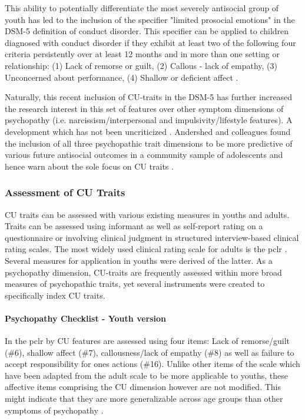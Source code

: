 This ability to potentially differentiate the most severely antisocial group of youth has led to the inclusion of the specifier "limited prosocial emotions" in the DSM-5 \parencite{DSM-5} definition of conduct disorder.
This specifier can be applied to children diagnosed with conduct disorder if they exhibit at least two of the following four criteria persistently over at least 12 months and in more than one setting or relationship:
(1) Lack of remorse or guilt,
(2) Callous - lack of empathy,
(3) Unconcerned about performance,
(4) Shallow or deficient affect \parencite{DSM-5}.

Naturally, this recent inclusion of CU-traits in the DSM-5 has further increased the research interest in this set of features over other symptom dimensions of psychopathy (i.e. narcissism/interpersonal and impulsivity/lifestyle features). 
A development which has not been uncriticized \parencite{lahey_what_2014}.
Andershed and colleagues found the inclusion of all three psychopathic trait dimensions to be more predictive of various future antisocial outcomes in a community sample of adolescents and hence warn about the sole focus on CU traits \parencite*{andershed_callous-unemotional_2018}.

\subsubsection{Assessment of CU Traits}
CU traits can be assessed with various existing measures in youths and adults.
Traits can be assessed using informant as well as self-report rating on a questionnaire
or involving clinical judgment in structured interview-based clinical rating scales.
The most widely used clinical rating scale for adults is the \gls{pclr}
\parencite{hare_pcl-r_2018} .
Several measures for application in youths were derived of the latter.
As a psychopathy dimension, CU-traits are frequently assessed within more broad measures of psychopathic traits,
yet several instruments were created to specifically index CU traits.

\paragraph{Psychopathy Checklist - Youth version}

In the \gls{pclr} by 
CU features are assessed using four items: Lack of remorse/guilt (\#6),
shallow affect (\#7), callousness/lack of empathy (\#8) as well as failure to accept responsibility for ones actions (\#16).
Unlike other items of the scale which have been adapted from the adult scale to be more applicable to youths,
these affective items comprising the CU dimension however are not modified. 
This might indicate that they are more generalizable across age groups than other symptoms of psychopathy \parencite{viding_callousunemotional_2018}.

